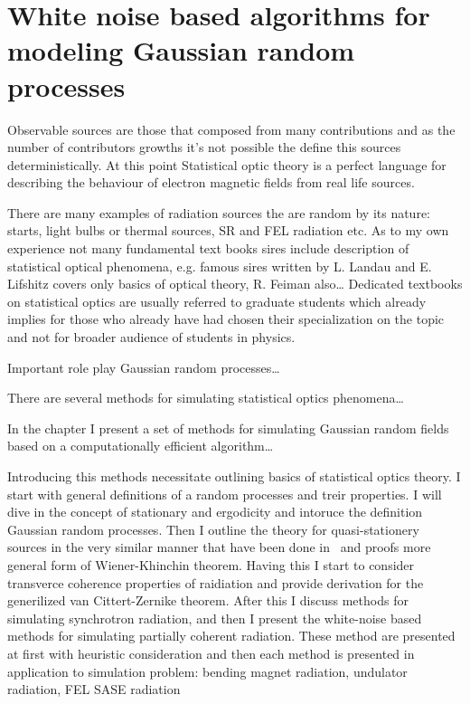 
\chapter{White noise based algorithms for modeling Gaussian random processes}
\label{Chapter:White noise based algorithms for modeling Gaussian random processes}
    Observable sources are those that composed from many contributions and as the number of contributors growths it's not possible the define this sources deterministically. At this point Statistical optic theory is a perfect language for describing the behaviour of electron magnetic fields from real life sources.

    There are many examples of radiation sources the are random by its nature: starts, light bulbs or thermal sources, SR and FEL radiation etc. As to my own experience not many fundamental text books sires include description of statistical optical phenomena, e.g. famous sires written by L. Landau and E. Lifshitz covers only basics of optical theory, R. Feiman also… Dedicated textbooks on statistical optics are usually referred to graduate students which already implies for those who already have had chosen their specialization on the topic and not for broader audience of students in physics. 

    Important role play Gaussian random processes…

    There are several methods for simulating statistical optics phenomena…

    In the chapter I present a set of methods for simulating Gaussian random fields based on a computationally efficient algorithm…

    Introducing this methods necessitate outlining basics of statistical optics theory. I start with general definitions of a random processes and treir properties. I will dive in the concept of stationary and ergodicity and intoruce the definition Gaussian random processes. Then I outline the theory for quasi-stationery sources in the very similar manner that have been done in~\cite{wolgoodman_statistical_2015} and proofs more general form of Wiener-Khinchin theorem. Having this I start to consider transverce coherence properties of raidiation and provide derivation for the generilized van Cittert-Zernike theorem. After this I discuss methods for simulating synchrotron radiation, and then I present the white-noise based methods for simulating partially coherent radiation. These method are presented at first with heuristic consideration and then each method is presented in application to simulation problem: bending magnet radiation, undulator radiation, FEL SASE radiation 
    
